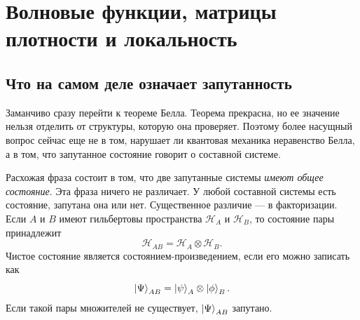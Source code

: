 \chapter{Волновые функции, матрицы плотности и локальность}


\section{Что на самом деле означает запутанность}

Заманчиво сразу перейти к теореме Белла. Теорема прекрасна, но ее значение нельзя отделить от структуры, которую она проверяет. Поэтому более насущный вопрос сейчас еще не в том, нарушает ли квантовая механика неравенство Белла, а в том, что запутанное состояние говорит о составной системе.

Расхожая фраза состоит в том, что две запутанные системы \emph{имеют общее состояние}. Эта фраза ничего не различает. У любой составной системы есть состояние, запутана она или нет. Существенное различие — в факторизации. Если \(A\) и \(B\) имеют гильбертовы пространства \(\mathcal H_A\) и \(\mathcal H_B\), то состояние пары принадлежит
\begin{equation}
\mathcal H_{AB}=\mathcal H_A\otimes\mathcal H_B.
\end{equation}
Чистое состояние является состоянием-произведением, если его можно записать как
\begin{equation}
\left\lvert\Psi\right\rangle_{AB}=\left\lvert\psi\right\rangle_A\otimes\left\lvert\phi\right\rangle_B.
\label{eq:l7-product-state}
\end{equation}
Если такой пары множителей не существует, \(\left\lvert\Psi\right\rangle_{AB}\) запутано.

